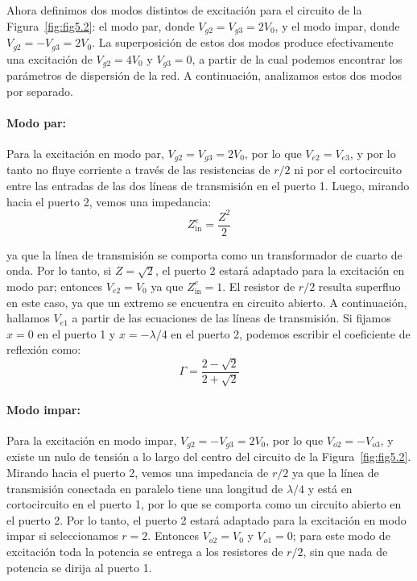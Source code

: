 Ahora definimos dos modos distintos de excitación para el circuito de la Figura~\ref{fig:fig5.2}: el modo par, donde $V_{g2} = V_{g3} = 2V_0$, y el modo impar, donde $V_{g2} = -V_{g3} = 2V_0$. La superposición de estos dos modos produce efectivamente una excitación de $V_{g2} = 4V_0$ y $V_{g3} = 0$, a partir de la cual podemos encontrar los parámetros de dispersión de la red. A continuación, analizamos estos dos modos por separado.

\paragraph{Modo par:} Para la excitación en modo par, $V_{g2} = V_{g3} = 2V_0$, por lo que $V_{e2} = V_{e3}$, y por lo tanto no fluye corriente a través de las resistencias de $r/2$ ni por el cortocircuito entre las entradas de las dos líneas de transmisión en el puerto 1. Luego, mirando hacia el puerto 2, vemos una impedancia:
\begin{equation}
Z_{\text{in}}^e = \frac{Z^2}{2}
\label{eq:impedancia_entrada_par}
\end{equation}

ya que la línea de transmisión se comporta como un transformador de cuarto de onda. Por lo tanto, si $Z = \sqrt{2}$, el puerto 2 estará adaptado para la excitación en modo par; entonces $V_{e2} = V_0$ ya que $Z_{\text{in}}^e = 1$. El resistor de $r/2$ resulta superfluo en este caso, ya que un extremo se encuentra en circuito abierto. A continuación, hallamos $V_{e1}$ a partir de las ecuaciones de las líneas de transmisión. Si fijamos $x = 0$ en el puerto 1 y $x = -\lambda/4$ en el puerto 2, podemos escribir el coeficiente de reflexión como:
\begin{equation}
\Gamma = \frac{2 - \sqrt{2}}{2 + \sqrt{2}}
\label{eq:coeficiente_reflexion}
\end{equation}

\paragraph{Modo impar:} Para la excitación en modo impar, $V_{g2} = -V_{g3} = 2V_0$, por lo que $V_{o2} = -V_{o3}$, y existe un nulo de tensión a lo largo del centro del circuito de la Figura~\ref{fig:fig5.2}. Mirando hacia el puerto 2, vemos una impedancia de $r/2$ ya que la línea de transmisión conectada en paralelo tiene una longitud de $\lambda/4$ y está en cortocircuito en el puerto 1, por lo que se comporta como un circuito abierto en el puerto 2. Por lo tanto, el puerto 2 estará adaptado para la excitación en modo impar si seleccionamos $r = 2$. Entonces $V_{o2} = V_0$ y $V_{o1} = 0$; para este modo de excitación toda la potencia se entrega a los resistores de $r/2$, sin que nada de potencia se dirija al puerto 1. 

